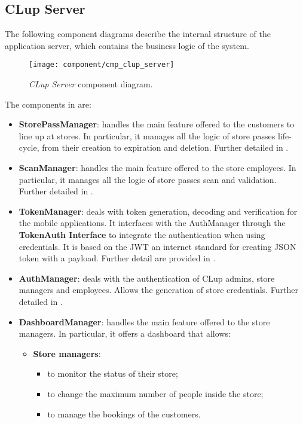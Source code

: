 \clearpage

\subsection{CLup Server}
The following component diagrams describe the internal structure of the application server, which contains the business logic of the system.

\begin{figure}[H]
	\centering
	\texttt{[image: component/cmp\_clup\_server]}
	\caption{\textit{CLup Server} component diagram.}
	\label{fig:cmp_clup_server}
\end{figure}
\clearpage

The components in  are:
\begin{itemize}
	\item \textbf{StorePassManager}: handles the main feature offered to the customers to line up at stores. In particular, it manages all the logic of store passes life-cycle, from their creation to expiration and deletion. Further detailed in .
	
	\item \textbf{ScanManager}: handles the main feature offered to the store employees. In particular, it manages all the logic of store passes scan and validation. Further detailed in .
	
	\item \textbf{TokenManager}: deals with token generation, decoding and verification for the mobile applications. It interfaces with the AuthManager through the \textbf{TokenAuth Interface} to integrate the authentication when using credentials. It is based on the JWT an internet standard for creating JSON token with a payload. Further detail are provided in .
	
	\item \textbf{AuthManager}: deals with the authentication of CLup admins, store managers and employees. Allows the generation of store credentials. Further detailed in .
	
	\item \textbf{DashboardManager}: handles the main feature offered to the store managers. In particular, it offers a dashboard that allows:
	\begin{itemize}
		\item \textbf{Store managers}:
				\begin{itemize}
					\item to monitor the status of their store;
					\item to change the maximum number of people inside the store;
					\item to manage the bookings of the customers.
				\end{itemize}
			

\end{itemize}
\end{itemize}
